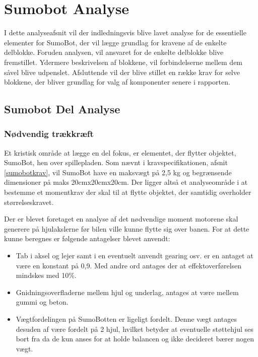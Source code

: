 \section{Sumobot Analyse}\label{sec:Sumobot:analyse}

I dette analyseafsnit vil der indledningsvis blive lavet analyse for de essentielle elementer for SumoBot, der vil lægge grundlag for kravene af de enkelte delblokke. Foruden analysen, vil ansvaret for de enkelte delblokke blive fremstillet. Ydermere beskrivelsen af blokkene, vil forbindelserne mellem dem såvel blive udpenslet. Afsluttende vil der blive stillet en række krav for selve blokkene, der bliver grundlag for valg af komponenter senere i rapporten.


\subsection{Sumobot Del Analyse}\label{subsubsec:SumoBot:Analyse}

\subsubsection{Nødvendig trækkræft}
Et kristisk område at lægge en del fokus, er elementet, der flytter objektet, SumoBot, hen over spillepladen. Som nævnt i kravspecifikationen, afsnit \ref{sumobotkrav}, vil SumoBot have en maksvægt på 2,5 kg og begrænsende dimensioner på maks 20cmx20cmx20cm. Der ligger altså et analyseområde i at bestemme et momentkrav der skal til at flytte objektet, der samtidig overholder størrelseskravet.

Der er blevet foretaget en analyse af det nødvendige moment motorene skal generere på hjulakslerne før bilen ville kunne flytte sig over banen.
For at dette kunne beregnes er følgende antagelser blevet anvendt:
 \begin{itemize}
   \item Tab i aksel og lejer samt i en eventuelt anvendt gearing osv. er en antaget at være en konstant på 0,9. Med andre ord antages der at effektoverførelsen mindskes med 10\%.
   \item Gnidningsoverfladerne mellem hjul og underlag, antages at være mellem gummi og beton. 
   \item Vægtfordelingen på SumoBotten er ligeligt fordelt. Denne vægt antages desuden af være fordelt på 2 hjul, hvilket betyder at eventuelle støttehjul ses bort fra da de kun anses for at holde balancen og ikke decideret bærer nogen vægt.
\end{itemize}

